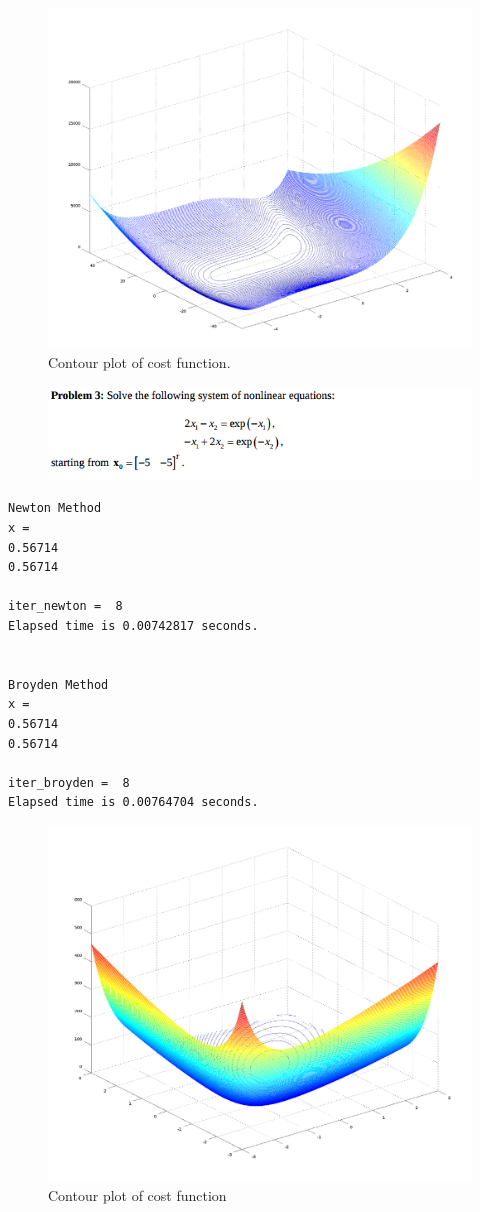 \documentclass[eng,openany]{mgr}
\begin{document}
\begin{figure}[h]
\centering
\includegraphics[width=0.7\linewidth]{screenshot004}
\caption{Contour plot of cost function.}
\label{fig:screenshot004}
\end{figure}
\clearpage



\begin{figure}[h]
\centering
\includegraphics[width=0.7\linewidth]{screenshot005}
\label{fig:screenshot005}
\end{figure}
\begin{lstlisting}
Newton Method
x =
0.56714
0.56714

iter_newton =  8
Elapsed time is 0.00742817 seconds.


Broyden Method
x =
0.56714
0.56714

iter_broyden =  8
Elapsed time is 0.00764704 seconds.
\end{lstlisting}
\begin{figure}[h]
\centering
\includegraphics[width=0.7\linewidth]{screenshot006}
\caption{Contour plot of cost function}
\label{fig:screenshot006}
\end{figure}
\clearpage
\end{document}

